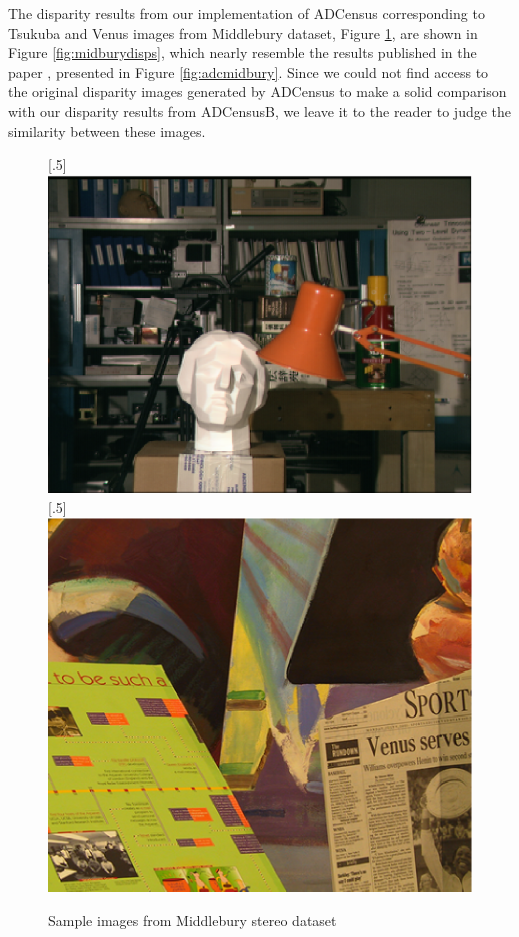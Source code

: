 The disparity results from our implementation of ADCensus corresponding to Tsukuba and Venus images from Middlebury dataset, 
Figure \ref{fig:midburyimgs}, are shown in Figure \ref{fig:midburydisps}, 
which nearly resemble the results published in the paper \cite{mei11}, presented in Figure \ref{fig:adcmidbury}. 
Since we could not find access to the original disparity images generated by ADCensus to make a solid comparison with our disparity results from ADCensusB, 
we leave it to the reader to judge the similarity between these images. 

\begin{figure}[H]
\centering
{}
[.5\linewidth]{\includegraphics[scale=0.5]{tsukubaL}}%
[.5\linewidth]{\includegraphics[scale=0.51]{venusL}}%
\caption{Sample images from Middlebury stereo dataset \protect\cite{midbdata}}
\label{fig:midburyimgs}
\end{figure}

